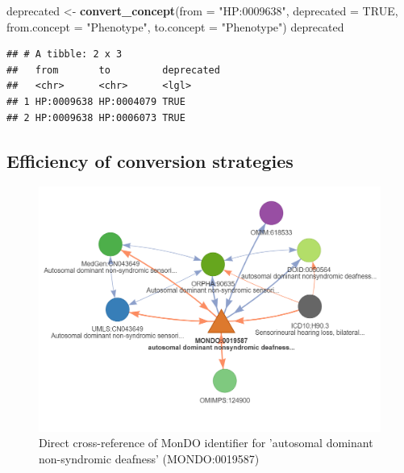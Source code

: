 \documentclass[9pt,a4paper,]{extarticle}
\newenvironment{Shaded}{\begin{snugshade}}{\end{snugshade}}
\newcommand{\DataTypeTok}[1]{\textcolor[rgb]{0.13,0.29,0.53}{#1}}
\newcommand{\KeywordTok}[1]{\textcolor[rgb]{0.13,0.29,0.53}{\textbf{#1}}}
\newcommand{\NormalTok}[1]{#1}
\newcommand{\OtherTok}[1]{\textcolor[rgb]{0.56,0.35,0.01}{#1}}
\newcommand{\StringTok}[1]{\textcolor[rgb]{0.31,0.60,0.02}{#1}}
\begin{document}
\begin{Shaded}
\begin{Highlighting}[]
\NormalTok{deprecated <-}\StringTok{ }\KeywordTok{convert_concept}\NormalTok{(}\DataTypeTok{from =} \StringTok{"HP:0009638"}\NormalTok{,}
                               \DataTypeTok{deprecated =} \OtherTok{TRUE}\NormalTok{,}
                               \DataTypeTok{from.concept =} \StringTok{"Phenotype"}\NormalTok{,}
                               \DataTypeTok{to.concept =} \StringTok{"Phenotype"}\NormalTok{) }
\NormalTok{deprecated}
\end{Highlighting}
\end{Shaded}

\begin{verbatim}
## # A tibble: 2 x 3
##   from       to         deprecated
##   <chr>      <chr>      <lgl>     
## 1 HP:0009638 HP:0004079 TRUE      
## 2 HP:0009638 HP:0006073 TRUE
\end{verbatim}

\hypertarget{efficiency-of-conversion-strategies}{%
\subsection{Efficiency of conversion strategies}\label{efficiency-of-conversion-strategies}}

\begin{figure}

{\centering \includegraphics[width=1\linewidth]{fig/Figure9} 

}

\caption{Direct cross-reference of MonDO identifier for 'autosomal dominant non-syndromic deafness' (MONDO:0019587)}\label{fig:effConversion}
\end{figure}
\end{document}
